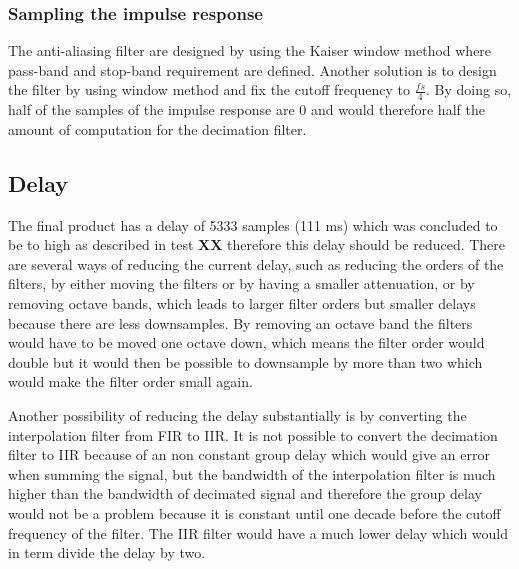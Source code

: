 \subsubsection*{Sampling the impulse response}
The anti-aliasing filter are designed by using the Kaiser window method where pass-band and stop-band requirement are defined. Another solution is to design the filter by using window method and fix the cutoff frequency to $\frac{fs}{4}$. By doing so, half of the samples of the impulse response are 0 and would therefore half the amount of computation for the decimation filter.






\subsection*{Delay}
The final product has a delay of 5333 samples (111 ms) which was concluded to be to high as described in test \textbf{XX} therefore this delay should be reduced. There are several ways of reducing the current delay, such as reducing the orders of the filters, by either moving the filters or by having a smaller attenuation, or by removing octave bands, which leads to larger filter orders but smaller delays because there are less downsamples. By removing an octave band the filters would have to be moved one octave down, which means the filter order would double but it would then be possible to downsample by more than two which would make the filter order small again.

Another possibility of reducing the delay substantially is by converting the interpolation filter from FIR to IIR. It is not possible to convert the decimation filter to IIR because of an non constant group delay which would give an error when summing the signal, but the bandwidth of the interpolation filter is much higher than the bandwidth of decimated signal and therefore the group delay would not be a problem because it is constant until one decade before the cutoff frequency of the filter. The IIR filter would have a much lower delay which would in term divide the delay by two.   

